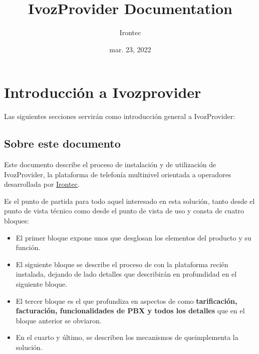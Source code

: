 \documentclass[letterpaper,10pt,spanish]{sphinxmanual}
\title{IvozProvider Documentation}
\date{mar. 23, 2022}
\author{Irontec}
\begin{document}
\maketitle
\tableofcontents
{}\label{index::doc}



\chapter{Introducción a Ivozprovider}
\label{intro/index::doc}\label{intro/index:introduction-to-ivozprovider}\label{intro/index:ivozprovider-official-documentation}
Las siguientes secciones servirán como introducción general a IvozProvider:


\section{Sobre este documento}
\label{intro/about:about-this-document}\label{intro/about::doc}
Este documento describe el proceso de instalación y de utilización de IvozProvider, la plataforma de telefonía multinivel orientada a operadores desarrollada por \href{http://irontec.com}{Irontec}.

Es el punto de partida para todo aquel interesado en esta solución, tanto desde el punto de vista técnico como desde el punto de vista de uso y consta de cuatro bloques:
\begin{itemize}
\item {} 
El primer bloque expone unos {\hyperref[index:concepts]{}} que desglosan los elementos del producto y su función.

\item {} 
El siguiente bloque se describe el proceso de {\hyperref[index:installation]{}} con la plataforma recién instalada, dejando de lado detalles que describirán en profundidad en el siguiente bloque.

\item {} 
El tercer bloque es el que profundiza en aspectos de {\hyperref[index:advanced]{}} como \textbf{tarificación, facturación, funcionalidades de PBX y todos los detalles} que en el bloque anterior se obviaron.

\item {} 
En el cuarto y último, se describen los mecanismos de {\hyperref[index:security]{}} queimplementa la solución.

\end{itemize}
\end{document}
